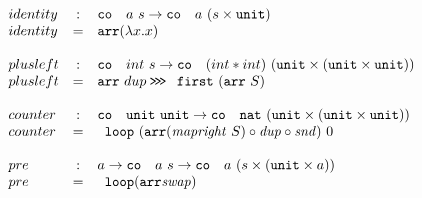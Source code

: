 \begin{equation}
    \begin{array}{lcl}
        identity &:& \co\ a \ s \rightarrow \co\ a \ (s \times \unittype)\\
        identity &=& \YArrow (\lambda x.x)\\\\ 
        plusleft &:& \co\ int\ s \rightarrow \co\ (int * int)\ (\unittype \times (\unittype \times \unittype))\\
        plusleft & = & \YArrow\ dup \YCompose \YFirst\ (\YArrow\ S)\\\\
        counter & : & \co\ \unittype\ \unittype \rightarrow \co\ {\tt{nat}}\ (\unittype \times (\unittype \times \unittype))\\
        counter & = & \YLoop\ (\YArrow ({\mathit{mapright}}\ S) \circ {\mathit{dup}} \circ {\mathit{snd}})\ 0\\\\
        pre &:& a \rightarrow \co\ a\ s \rightarrow \co\ a\ (s \times (\unittype \times a))\\
        pre &=& \YLoop (\YArrow {\mathit{swap}})  
    \end{array}
\end{equation}




  




      

